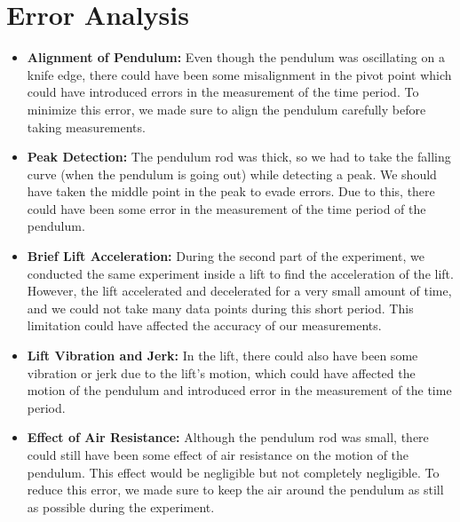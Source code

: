 \section{Error Analysis}
	\begin{itemize}
		\item \textbf{Alignment of Pendulum:} Even though the pendulum was oscillating on a knife edge, there could have been some misalignment in the pivot point which could have introduced errors in the measurement of the time period. To minimize this error, we made sure to align the pendulum carefully before taking measurements.
		\item \textbf{Peak Detection:} The pendulum rod was thick, so we had to take the falling curve (when the pendulum is going out) while detecting a peak. We should have taken the middle point in the peak to evade errors. Due to this, there could have been some error in the measurement of the time period of the pendulum.
		\item \textbf{Brief Lift Acceleration:} During the second part of the experiment, we conducted the same experiment inside a lift to find the acceleration of the lift. However, the lift accelerated and decelerated for a very small amount of time, and we could not take many data points during this short period. This limitation could have affected the accuracy of our measurements.
		\item \textbf{Lift Vibration and Jerk:} In the lift, there could also have been some vibration or jerk due to the lift's motion, which could have affected the motion of the pendulum and introduced error in the measurement of the time period.
		\item \textbf{Effect of Air Resistance:} Although the pendulum rod was small, there could still have been some effect of air resistance on the motion of the pendulum. This effect would be negligible but not completely negligible. To reduce this error, we made sure to keep the air around the pendulum as still as possible during the experiment.
	\end{itemize}